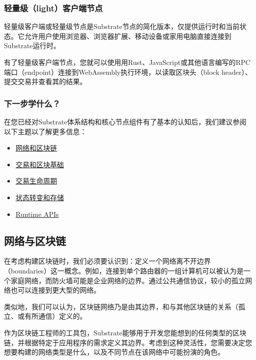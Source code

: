 \hypertarget{ux8f7bux91cfux7ea7lightuxff09ux5ba2ux6237ux7aefux8282ux70b9}{%
\subsubsection{轻量级（light）客户端节点}\label{ux8f7bux91cfux7ea7lightuxff09ux5ba2ux6237ux7aefux8282ux70b9}}

轻量级客户端或轻量级节点是Substrate节点的简化版本，仅提供运行时和当前状态。它允许用户使用浏览器、浏览器扩展、移动设备或家用电脑直接连接到Substrate运行时。

有了轻量级客户端节点，您就可以使用用Rust、JavaScript或其他语言编写的RPC端口（endpoint）连接到WebAssembly执行环境，以读取区块头（block
header）、提交交易并查看其的结果。

\hypertarget{ux4e0bux4e00ux6b65ux5b66ux4ec0ux4e48}{%
\subsubsection{下一步学什么？}\label{ux4e0bux4e00ux6b65ux5b66ux4ec0ux4e48}}

在您已经对Substrate体系结构和核心节点组件有了基本的认知后，我们建议参阅以下主题以了解更多信息：

\begin{itemize}
\item
  \href{/fundamentals/node-and-network-types}{网络和区块链}
\item
  \href{/fundamentals/transaction-types}{交易和区块基础}
\item
  \href{/fundamentals/transaction-lifecycle/}{交易生命周期}
\item
  \href{/fundamentals/state-transitions-and-storage/}{状态转变和存储}
\item
  \href{/reference/runtime-apis/}{Runtime APIs}
\end{itemize}

\subsection{网络与区块链}

在考虑构建区块链时，我们必须要认识到：定义一个网络离不开边界（boundaries）这一概念。例如，连接到单个路由器的一组计算机可以被认为是一个家庭网络，而防火墙可能是企业网络的边界。通过公共通信协议，较小的孤立网络也可以连接到更大型的网络。

类似地，我们可以认为，区块链网络乃是由其边界，和与其他区块链的关系（孤立、或有所通信）定义的。

作为区块链工程师的工具包，Substrate能够用于开发您能想到的任何类型的区块链，并根据特定于应用程序的需求定义其边界。考虑到这种灵活性，您需要决定您想要构建的网络类型是什么，以及不同节点在该网络中可能扮演的角色。


